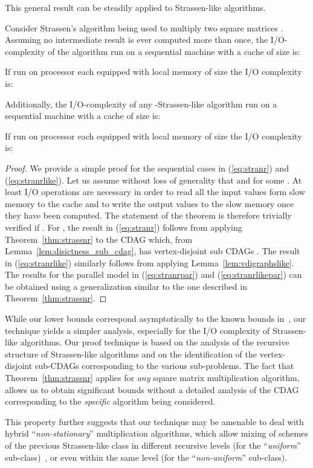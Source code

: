 \documentclass[a4paper,UKenglish]{lipics-v2016}
\newcommand{\io }{I/O }
\begin{document}
This general result can be steadily applied to Strassen-like algorithms.
\begin{corollary}
Consider Strassen's algorithm being used to multiply two square
matrices .  Assuming no intermediate result is
ever computed more than once, the I/O-complexity of the algorithm run
on a sequential machine with a cache of size  is:

If run on  processor each equipped with local memory of size  the \io complexity is:

Additionally, the I/O-complexity of any -Strassen-like algorithm run on a sequential machine with a cache of size  is:

If run on  processor each equipped with local memory of size  the \io complexity is:

\end{corollary}
\begin{proof}
	We provide a simple proof for the sequential cases in (\ref{eq:stranr}) and (\ref{eq:stranrlike}). Let us assume without loss of generality that  and   for some . At least  \io operations are necessary in order to read all the  input values form slow memory to the cache and to write the  output values to the slow memory once they have been computed. The statement of the theorem is therefore trivially verified if . 
For , the result in (\ref{eq:stranr}) follows from applying Theorem~\ref{thm:strassnr} to the  CDAG which, from Lemma~\ref{lem:disictness_sub_cdag}, has  vertex-disjoint sub CDAGs . 
The result in (\ref{eq:stranrlike}) similarly follows from applying Lemma~\ref{lem:vdigraphslike}. The results for the parallel model in (\ref{eq:stranrpar}) and (\ref{eq:stranrlikepar}) can be obtained using a generalization similar to the one described in Theorem~\ref{thm:strassnr}.
\end{proof}
While our lower bounds correspond asymptotically to the known bounds
in~\cite{scott2015matrix}, our technique yields a simpler analysis,
especially for the \io complexity of Strassen-like algorithms. Our
proof technique is based on the analysis of the recursive structure of
Strassen-like algorithms and on the identification of the
vertex-disjoint sub-CDAGs corresponding to the various
sub-problems. The fact that Theorem~\ref{thm:strassnr} applies for
\emph{any} square matrix multiplication algorithm, allows us to obtain
significant bounds without a detailed analysis of the CDAG
corresponding to the \emph{specific} algorithm being considered.

This property further suggests that our technique may be amenable to
deal with hybrid ``\emph{non-stationary}'' multiplication algorithms, which allow mixing of schemes of the previous Strassen-like class in different recursive levels (for the ``\emph{uniform}'' sub-class)~\cite{douglas1994gemmw}, or even within the same level (for the ``\emph{non-uniform}'' sub-class).
\end{document}

